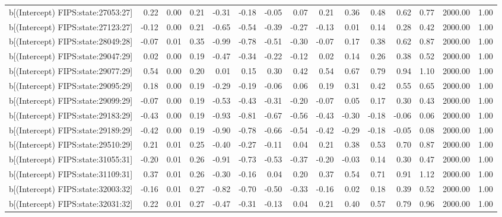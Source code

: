\begin{table}[ht]
\begin{tabular}{rrrrrrrrrrrrrrr}
  b[(Intercept) FIPS:state:27053:27] & 0.22 & 0.00 & 0.21 & -0.31 & -0.18 & -0.05 & 0.07 & 0.21 & 0.36 & 0.48 & 0.62 & 0.77 & 2000.00 & 1.00 \\ 
  b[(Intercept) FIPS:state:27123:27] & -0.12 & 0.00 & 0.21 & -0.65 & -0.54 & -0.39 & -0.27 & -0.13 & 0.01 & 0.14 & 0.28 & 0.42 & 2000.00 & 1.00 \\ 
  b[(Intercept) FIPS:state:28049:28] & -0.07 & 0.01 & 0.35 & -0.99 & -0.78 & -0.51 & -0.30 & -0.07 & 0.17 & 0.38 & 0.62 & 0.87 & 2000.00 & 1.00 \\ 
  b[(Intercept) FIPS:state:29047:29] & 0.02 & 0.00 & 0.19 & -0.47 & -0.34 & -0.22 & -0.12 & 0.02 & 0.14 & 0.26 & 0.38 & 0.52 & 2000.00 & 1.00 \\ 
  b[(Intercept) FIPS:state:29077:29] & 0.54 & 0.00 & 0.20 & 0.01 & 0.15 & 0.30 & 0.42 & 0.54 & 0.67 & 0.79 & 0.94 & 1.10 & 2000.00 & 1.00 \\ 
  b[(Intercept) FIPS:state:29095:29] & 0.18 & 0.00 & 0.19 & -0.29 & -0.19 & -0.06 & 0.06 & 0.19 & 0.31 & 0.42 & 0.55 & 0.65 & 2000.00 & 1.00 \\ 
  b[(Intercept) FIPS:state:29099:29] & -0.07 & 0.00 & 0.19 & -0.53 & -0.43 & -0.31 & -0.20 & -0.07 & 0.05 & 0.17 & 0.30 & 0.43 & 2000.00 & 1.00 \\ 
  b[(Intercept) FIPS:state:29183:29] & -0.43 & 0.00 & 0.19 & -0.93 & -0.81 & -0.67 & -0.56 & -0.43 & -0.30 & -0.18 & -0.06 & 0.06 & 2000.00 & 1.00 \\ 
  b[(Intercept) FIPS:state:29189:29] & -0.42 & 0.00 & 0.19 & -0.90 & -0.78 & -0.66 & -0.54 & -0.42 & -0.29 & -0.18 & -0.05 & 0.08 & 2000.00 & 1.00 \\ 
  b[(Intercept) FIPS:state:29510:29] & 0.21 & 0.01 & 0.25 & -0.40 & -0.27 & -0.11 & 0.04 & 0.21 & 0.38 & 0.53 & 0.70 & 0.87 & 2000.00 & 1.00 \\ 
  b[(Intercept) FIPS:state:31055:31] & -0.20 & 0.01 & 0.26 & -0.91 & -0.73 & -0.53 & -0.37 & -0.20 & -0.03 & 0.14 & 0.30 & 0.47 & 2000.00 & 1.00 \\ 
  b[(Intercept) FIPS:state:31109:31] & 0.37 & 0.01 & 0.26 & -0.30 & -0.16 & 0.04 & 0.20 & 0.37 & 0.54 & 0.71 & 0.91 & 1.12 & 2000.00 & 1.00 \\ 
  b[(Intercept) FIPS:state:32003:32] & -0.16 & 0.01 & 0.27 & -0.82 & -0.70 & -0.50 & -0.33 & -0.16 & 0.02 & 0.18 & 0.39 & 0.52 & 2000.00 & 1.00 \\ 
  b[(Intercept) FIPS:state:32031:32] & 0.22 & 0.01 & 0.27 & -0.47 & -0.31 & -0.13 & 0.04 & 0.21 & 0.40 & 0.57 & 0.79 & 0.96 & 2000.00 & 1.00 \\ 

\end{tabular}
\end{table}

